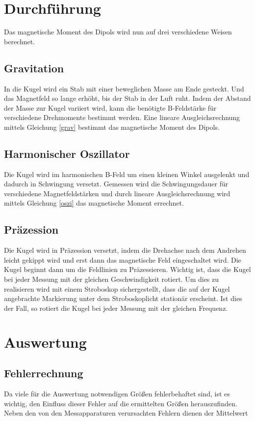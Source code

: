 \section{Durchführung}
Das magnetische Moment des Dipols wird nun auf drei verschiedene Weisen berechnet.

\subsection{Gravitation}
In die Kugel wird ein Stab mit einer beweglichen Masse am Ende gesteckt. Und das Magnetfeld so lange erhöht, bis der Stab in der Luft ruht. Indem der Abstand der Masse zur Kugel variiert wird, kann die benötigte B-Feldstärke für verschiedene Drehmomente bestimmt werden. Eine lineare Ausgleichsrechnung mittels Gleichung \eqref{grav} bestimmt das magnetische Moment des Dipols.
\subsection{Harmonischer Oszillator}
Die Kugel wird im harmonischen B-Feld um einen kleinen Winkel ausgelenkt und dadurch in Schwingung versetzt.
Gemessen wird die Schwingungsdauer für verschiedene Magnetfeldstärken und durch lineare Ausgleichsrechnung wird mittels Gleichung \eqref{oszi} das magnetische Moment errechnet.
\subsection{Präzession}
Die Kugel wird in Präzession versetzt, indem die Drehachse nach dem Andrehen leicht gekippt wird und erst dann das magnetische Feld eingeschaltet wird. Die Kugel beginnt dann um die Feldlinien zu Präzessieren. Wichtig ist, dass die Kugel bei jeder Messung mit der gleichen Geschwindigkeit rotiert. Um dies zu realisieren wird mit einem Stroboskop sichergestellt, dass die auf der Kugel angebrachte Markierung unter dem Stroboskoplicht stationär erscheint. Ist dies der Fall, so rotiert die Kugel bei jeder Messung mit der gleichen Frequenz.  

\section{Auswertung}
\subsection{Fehlerrechnung}
Da viele für die Auswertung notwendigen Größen fehlerbehaftet sind, ist es wichtig, den Einfluss dieser Fehler auf die ermittelten
Größen herauszufinden. Neben den von den Messapparaturen verursachten Fehlern dienen der Mittelwert

